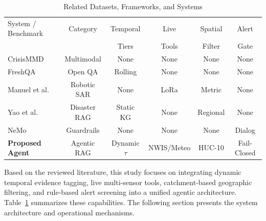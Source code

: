 \documentclass[conference]{IEEEtran}
\begin{document}
\begin{table}[ht]
\caption{Related Datasets, Frameworks, and Systems}
\label{tab:lit}
\centering
\scriptsize
\setlength{\tabcolsep}{1.2pt}
\begin{tabular*}{\columnwidth}{@{\extracolsep{\fill}}lccccc@{}}
\toprule
System / Benchmark & Category & Temporal & Live & Spatial & Alert \\
                   &          & Tiers & Tools & Filter & Gate \\
\midrule
CrisisMMD \cite{crisismmd} & Multimodal & None & None & None & None \\
FreshQA \cite{freshqa} & Open QA & Rolling & None & None & None \\
Manuel et al. \cite{manuel2024} & Robotic SAR & None & LoRa & Metric & None \\
Yao et al. \cite{zhang2024} & Disaster RAG & Static KG & None & Regional & None \\
NeMo \cite{nemoguardrails} & Guardrails & None & None & None & Dialog \\
\midrule
\textbf{Proposed Agent} & Agentic RAG & Dynamic $\tau$ & NWIS/Meteo & HUC-10 & Fail-Closed \\
\bottomrule
\end{tabular*}
\end{table}

Based on the reviewed literature, this study focuses on integrating dynamic temporal evidence tagging, live multi-sensor tools, catchment-based geographic filtering, and rule-based alert screening into a unified agentic architecture. Table~\ref{tab:lit} summarizes these capabilities. The following section presents the system architecture and operational mechanisms.
\end{document}
